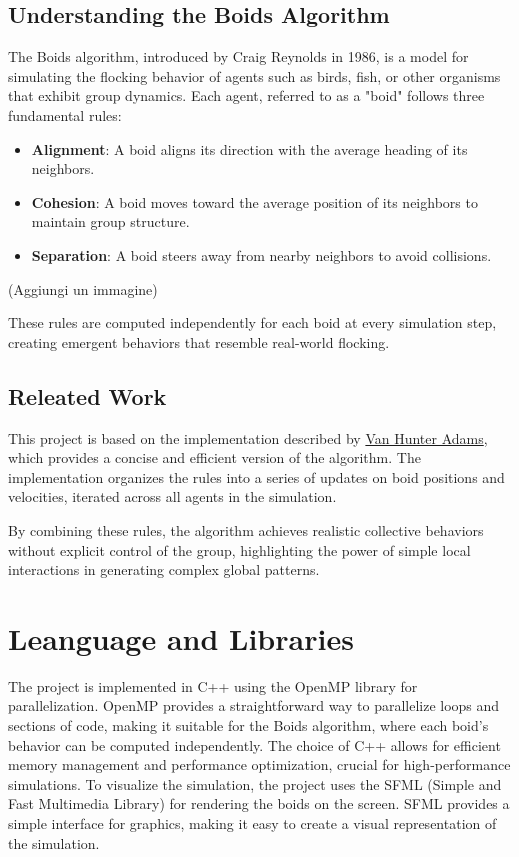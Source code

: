 \documentclass[10pt,twocolumn,letterpaper]{article}
\begin{document}
\subsection{Understanding the Boids Algorithm}
The Boids algorithm, introduced by Craig Reynolds in 1986, is a model for simulating the flocking behavior of agents such as birds, fish, or other organisms that exhibit group dynamics. Each agent, referred to as a "boid" follows three fundamental rules:

\begin{itemize}
    \item \textbf{Alignment}: A boid aligns its direction with the average heading of its neighbors.  
    \item \textbf{Cohesion}: A boid moves toward the average position of its neighbors to maintain group structure.  
    \item \textbf{Separation}: A boid steers away from nearby neighbors to avoid collisions.  
\end{itemize}

(Aggiungi un immagine)

These rules are computed independently for each boid at every simulation step, creating emergent behaviors that resemble real-world flocking.  

\subsection{Releated Work}
This project is based on the implementation described by \href{https://vanhunteradams.com/Pico/Animal_Movement/Boids-algorithm.html}{Van Hunter Adams}, which provides a concise and efficient version of the algorithm. The implementation organizes the rules into a series of updates on boid positions and velocities, iterated across all agents in the simulation.

By combining these rules, the algorithm achieves realistic collective behaviors without explicit control of the group, highlighting the power of simple local interactions in generating complex global patterns.

\section{Leanguage and Libraries}
The project is implemented in C++ using the OpenMP library for parallelization. OpenMP provides a straightforward way to parallelize loops and sections of code, making it suitable for the Boids algorithm, where each boid's behavior can be computed independently. The choice of C++ allows for efficient memory management and performance optimization, crucial for high-performance simulations.
To visualize the simulation, the project uses the SFML (Simple and Fast Multimedia Library) for rendering the boids on the screen. SFML provides a simple interface for graphics, making it easy to create a visual representation of the simulation.
\end{document}
